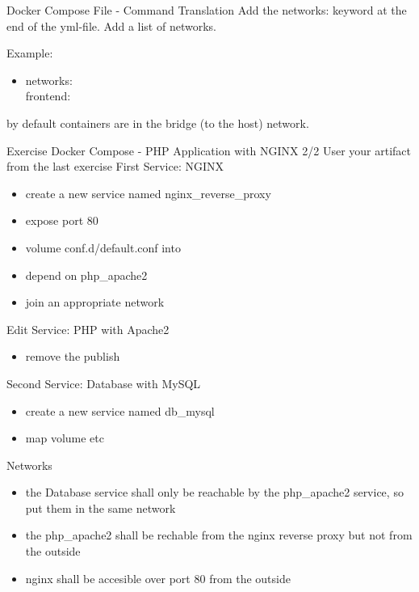 \documentclass[10pt,aspectratio=\ratio,
compress
]{beamer}
\begin{document}
\begin{frame}{Docker Compose File - Command Translation}
Add the networks: keyword at the end of the yml-file.
Add a list of networks.

Example: 
\begin{itemize}
	\item networks: \\
	     	frontend:
\end{itemize}
by default containers are in the bridge (to the host) network.

\end{frame}



\begin{frame}{Exercise Docker Compose - PHP Application with NGINX 2/2}
User your artifact from the last exercise
First Service: NGINX
\begin{itemize}
	\item create a new service named nginx\_reverse\_proxy
	\item expose port 80
	\item volume conf.d/default.conf into
	\item depend on php\_apache2
	\item join an appropriate network
\end{itemize}
Edit Service: PHP with Apache2
\begin{itemize}
	\item remove the publish
\end{itemize}
Second Service: Database with MySQL
\begin{itemize}
	\item create a new service named db\_mysql
	\item map volume etc
\end{itemize}
Networks
\begin{itemize}
	\item the Database service shall only be reachable by the php\_apache2 service, so put them in the same network
	\item the php\_apache2 shall be rechable from the nginx reverse proxy but not from the outside
	\item nginx shall be accesible over port 80 from the outside
\end{itemize}
\end{frame}
\end{document}

